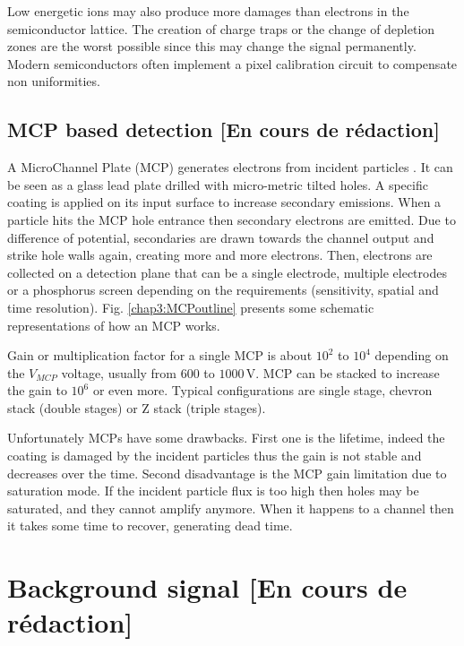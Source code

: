 \begin{refsection}
  Low energetic ions may also produce more damages than electrons in the semiconductor lattice. The creation of charge traps or the change of depletion zones are the worst possible since this may change the signal permanently. Modern semiconductors often implement a pixel calibration circuit to compensate non uniformities.

  \subsection{MCP based detection  [En cours de rédaction]}

  A MicroChannel Plate (MCP) generates electrons from incident particles \cite{Wiza1979}.
  It can be seen as a glass lead plate drilled with micro-metric tilted holes.
  A specific coating is applied on its input surface to increase secondary emissions. When a particle hits the MCP hole entrance then secondary electrons are emitted. Due to difference of potential, secondaries are drawn towards the channel output and strike hole walls again, creating more and more electrons. Then, electrons are collected on a detection plane that can be a single electrode, multiple electrodes or a phosphorus screen depending on the requirements (sensitivity, spatial and time resolution). Fig. \ref{chap3:MCPoutline} presents some schematic representations of how an MCP works.

  

  

  Gain or multiplication factor for a single MCP is about $10^{2}$ to $10^{4}$ depending on the $V_{MCP}$ voltage, usually from $600$ to $1000\,\mathrm{V}$. MCP can be stacked to increase the gain to $10^{6}$ or even more. Typical configurations are single stage, chevron stack (double stages) or Z stack (triple stages).

  Unfortunately MCPs have some drawbacks. First one is the lifetime, indeed the coating is damaged by the incident particles thus the gain is not stable and decreases over the time. Second disadvantage is the MCP gain limitation due to saturation mode. If the incident particle flux is too high then holes may be saturated, and they cannot amplify anymore. When it happens to a channel then it takes some time to recover, generating dead time.

  \section{Background signal [En cours de rédaction]}

\end{refsection}
